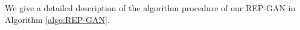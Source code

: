 \documentclass[runningheads]{llncs}
\newcommand{\<}{\left\langle}
\renewcommand{\>}{\right\rangle}
\begin{document}
We give a detailed description of the algorithm procedure of our REP-GAN in Algorithm \ref{algo:REP-GAN}.




\end{document}
